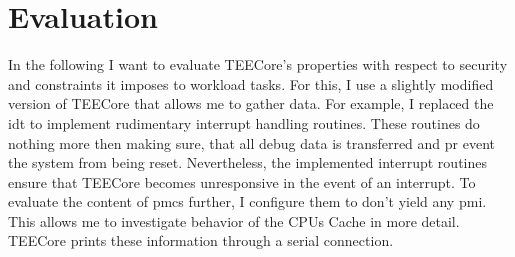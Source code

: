 \chapter{Evaluation}
\label{sec:evaluation}


In the following I want to evaluate TEECore's properties with respect to
security and constraints it imposes to workload tasks. For this, I use a
slightly modified version of TEECore that allows me to gather data. For example,
I replaced the \gls{idt} to implement rudimentary interrupt handling routines.
These routines do nothing more then making sure, that all debug data is
transferred and pr event the system from being reset. Nevertheless, the
implemented interrupt routines ensure that TEECore becomes unresponsive in the
event of an interrupt. To evaluate the content of \glspl{pmc} further, I
configure them to don't yield any \gls{pmi}. This allows me to investigate
behavior of the CPUs Cache in more detail. TEECore prints these information
through a serial connection.\\

